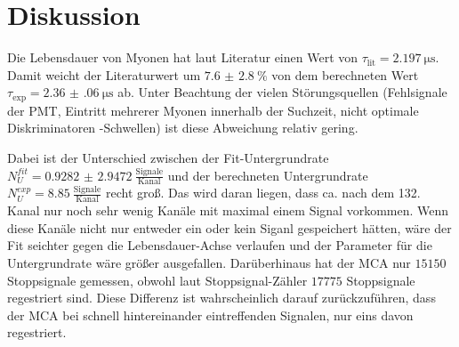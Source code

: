 \section{Diskussion}
\label{sec:Diskussion}


Die Lebensdauer von Myonen hat laut Literatur \cite{Elementarteilchenphysik} einen Wert von $\tau_\text{lit} = \SI{2.197}{\micro\s}$. 
Damit weicht der Literaturwert um $\SI{7.6(28)}{\percent}$ von dem berechneten Wert $\tau_\text{exp} = \SI{2.36(06)}{\micro\s}$ ab. Unter Beachtung der vielen Störungsquellen (Fehlsignale der PMT, Eintritt mehrerer Myonen innerhalb der Suchzeit, nicht optimale Diskriminatoren -Schwellen) ist diese Abweichung relativ gering. 

Dabei ist der Unterschied zwischen der Fit-Untergrundrate $N_U^{fit} = \num{0.9282(29472)} \: \frac{\text{Signale}}{\text{Kanal}}$ und der berechneten Untergrundrate $N_U^{exp} = \num{8.85} \: \frac{\text{Signale}}{\text{Kanal}}$ recht groß. Das wird daran liegen, dass ca. nach dem 132. Kanal nur noch sehr wenig Kanäle mit maximal einem Signal vorkommen. Wenn diese Kanäle nicht nur entweder ein oder kein Siganl gespeichert hätten, wäre der Fit seichter gegen die Lebensdauer-Achse verlaufen und der Parameter für die Untergrundrate wäre größer ausgefallen. Darüberhinaus hat der MCA nur $\num{15150}$ Stoppsignale gemessen, obwohl laut Stoppsignal-Zähler $\num{17775}$ Stoppsignale regestriert sind. Diese Differenz ist wahrscheinlich darauf zurückzuführen, dass der MCA bei schnell hintereinander eintreffenden Signalen, nur eins davon regestriert.

